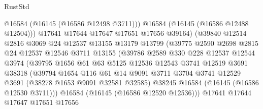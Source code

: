 \begin{lexlean}{RustStd}
\begin{coremodule}
                              @16584
                              (@16145 (@16586 @12498 @3711)))
                            @16584
                            (@16145 (@16586 @12488 @12504)))
                          @17641
                          @17644
                          @17647
                          @17651
                          @17656
                          @39164)
                        (@39840
                          @12514
                          @2816
                          @3069
                          @24
                          @12537
                          @13155
                          @13179
                          @13799
                          (@39775
                            @2590
                            @2698
                            @2815
                            @24
                            @12537
                            @12546
                            @3711
                            @13155
                            (@39786
                              @2589
                              @330
                              @228
                              @12537
                              @12544
                              @3974
                              (@39795
                                @1656
                                @61
                                @63
                                @5125
                                @12536
                                @12543
                                @3741
                                @12519
                                @3691
                                @38318
                                (@39794
                                  @1654
                                  @116
                                  @61
                                  @14
                                  @9091
                                  @3711
                                  @3704
                                  @3741
                                  @12529
                                  @3691
                                  (@38278 @1653 @9091 @32581 @32585)
                                  @38245
                                  @16584
                                  (@16145 (@16586 @12530 @3711)))
                                @16584
                                (@16145 (@16586 @12520 @12536)))
                              @17641
                              @17644
                              @17647
                              @17651
                              @17656

\end{coremodule}
\end{lexlean}
